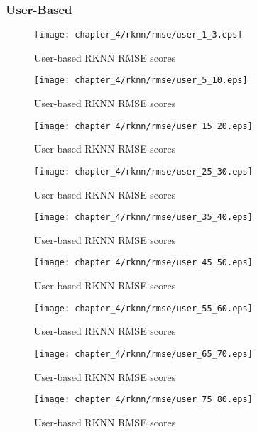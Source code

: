 \subsubsection{User-Based}

\begin{figure}[H]
\centering
\texttt{[image: chapter\_4/rknn/rmse/user\_1\_3.eps]}
\caption{User-based RKNN RMSE scores}
\end{figure}

\begin{figure}[H]
\centering
\texttt{[image: chapter\_4/rknn/rmse/user\_5\_10.eps]}
\caption{User-based RKNN RMSE scores}
\end{figure}

\begin{figure}[H]
\centering
\texttt{[image: chapter\_4/rknn/rmse/user\_15\_20.eps]}
\caption{User-based RKNN RMSE scores}
\end{figure}

\begin{figure}[H]
\centering
\texttt{[image: chapter\_4/rknn/rmse/user\_25\_30.eps]}
\caption{User-based RKNN RMSE scores}
\end{figure}

\begin{figure}[H]
\centering
\texttt{[image: chapter\_4/rknn/rmse/user\_35\_40.eps]}
\caption{User-based RKNN RMSE scores}
\end{figure}

\begin{figure}[H]
\centering
\texttt{[image: chapter\_4/rknn/rmse/user\_45\_50.eps]}
\caption{User-based RKNN RMSE scores}
\end{figure}

\begin{figure}[H]
\centering
\texttt{[image: chapter\_4/rknn/rmse/user\_55\_60.eps]}
\caption{User-based RKNN RMSE scores}
\end{figure}

\begin{figure}[H]
\centering
\texttt{[image: chapter\_4/rknn/rmse/user\_65\_70.eps]}
\caption{User-based RKNN RMSE scores}
\end{figure}

\begin{figure}[H]
\centering
\texttt{[image: chapter\_4/rknn/rmse/user\_75\_80.eps]}
\caption{User-based RKNN RMSE scores}
\end{figure}


